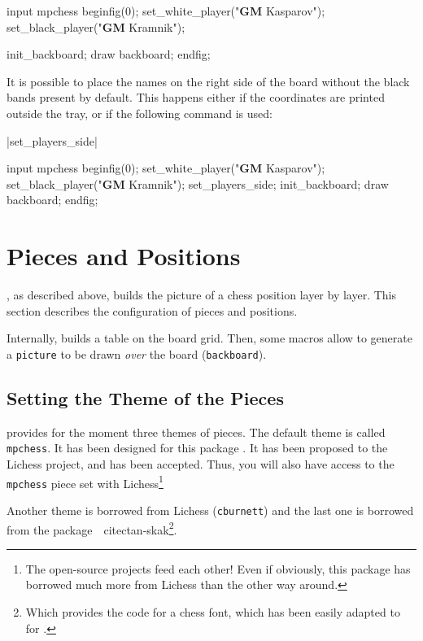 \documentclass[english]{ltxdoc}
\begin{document}
\begin{ExempleMP}
input mpchess
beginfig(0);
set_white_player("\textbf{GM} Kasparov");
set_black_player("\textbf{GM} Kramnik");

init_backboard;
draw backboard;
endfig;
\end{ExempleMP}

It is possible to place the names on the right side of the board without the
black bands present by default. 
This happens either if the coordinates are printed outside the tray, or if the
following command is used:

\commande|set_players_side|\smallskip

\begin{ExempleMP}[righthand width=0.6\linewidth]
input mpchess
beginfig(0);
set_white_player("\textbf{GM} Kasparov");
set_black_player("\textbf{GM} Kramnik");
set_players_side;
init_backboard;
draw backboard;
endfig;
\end{ExempleMP}



\section{Pieces and Positions}

\mpchess, as described above, builds the picture of a chess position
layer by layer. This section describes the configuration of pieces and
positions.

Internally, \mpchess builds a table on the board grid. Then, some
macros allow to generate a \lstinline+picture+ to be drawn \emph{over} the board (\lstinline+backboard+).

\subsection{Setting the Theme of the Pieces}

\mpchess provides for the moment three themes of pieces. The default theme is
called \lstinline+mpchess+. It has been designed for this package .
It has been proposed to the Lichess project, and has been accepted. Thus, you
will also have access to the \lstinline+mpchess+ piece set with
Lichess\footnote{The open-source projects feed each other! Even if obviously,
this package has borrowed much more from Lichess than the other way around.}

Another theme is borrowed from
Lichess (\lstinline+cburnett+) and the last one is borrowed from the
package~~cite{ctan-skak}\footnote{Which provides the \MF{} code
for a chess font, which has been easily adapted to \MP{} for \mpchess.}.
\end{document}
